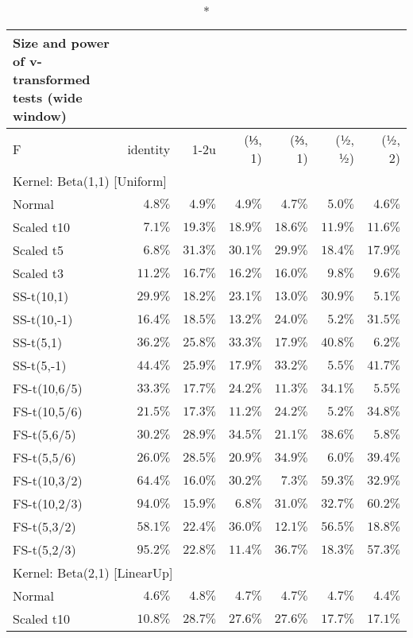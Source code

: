 \setlength{\LTpost}{0mm}
\begin{longtable}{lrrrrrr}
\caption*{
{\large Size and power of v-transformed tests (wide window)}
} \\ 
\toprule
F & identity & \textbar{}1-2u\textbar{} & (⅓, 1) & (⅔, 1) & (½, ½) & (½, 2) \\ 
\midrule
\multicolumn{7}{l}{Kernel: Beta(1,1) [Uniform]} \\ 
\midrule
Normal & $4.8\%$ & $4.9\%$ & $4.9\%$ & $4.7\%$ & $5.0\%$ & $4.6\%$ \\ 
Scaled t10 & $7.1\%$ & $19.3\%$ & $18.9\%$ & $18.6\%$ & $11.9\%$ & $11.6\%$ \\ 
Scaled t5 & $6.8\%$ & $31.3\%$ & $30.1\%$ & $29.9\%$ & $18.4\%$ & $17.9\%$ \\ 
Scaled t3 & $11.2\%$ & $16.7\%$ & $16.2\%$ & $16.0\%$ & $9.8\%$ & $9.6\%$ \\ 
SS-t(10,1) & $29.9\%$ & $18.2\%$ & $23.1\%$ & $13.0\%$ & $30.9\%$ & $5.1\%$ \\ 
SS-t(10,-1) & $16.4\%$ & $18.5\%$ & $13.2\%$ & $24.0\%$ & $5.2\%$ & $31.5\%$ \\ 
SS-t(5,1) & $36.2\%$ & $25.8\%$ & $33.3\%$ & $17.9\%$ & $40.8\%$ & $6.2\%$ \\ 
SS-t(5,-1) & $44.4\%$ & $25.9\%$ & $17.9\%$ & $33.2\%$ & $5.5\%$ & $41.7\%$ \\ 
FS-t(10,6/5) & $33.3\%$ & $17.7\%$ & $24.2\%$ & $11.3\%$ & $34.1\%$ & $5.5\%$ \\ 
FS-t(10,5/6) & $21.5\%$ & $17.3\%$ & $11.2\%$ & $24.2\%$ & $5.2\%$ & $34.8\%$ \\ 
FS-t(5,6/5) & $30.2\%$ & $28.9\%$ & $34.5\%$ & $21.1\%$ & $38.6\%$ & $5.8\%$ \\ 
FS-t(5,5/6) & $26.0\%$ & $28.5\%$ & $20.9\%$ & $34.9\%$ & $6.0\%$ & $39.4\%$ \\ 
FS-t(10,3/2) & $64.4\%$ & $16.0\%$ & $30.2\%$ & $7.3\%$ & $59.3\%$ & $32.9\%$ \\ 
FS-t(10,2/3) & $94.0\%$ & $15.9\%$ & $6.8\%$ & $31.0\%$ & $32.7\%$ & $60.2\%$ \\ 
FS-t(5,3/2) & $58.1\%$ & $22.4\%$ & $36.0\%$ & $12.1\%$ & $56.5\%$ & $18.8\%$ \\ 
FS-t(5,2/3) & $95.2\%$ & $22.8\%$ & $11.4\%$ & $36.7\%$ & $18.3\%$ & $57.3\%$ \\ 
\midrule
\multicolumn{7}{l}{Kernel: Beta(2,1) [LinearUp]} \\ 
\midrule
Normal & $4.6\%$ & $4.8\%$ & $4.7\%$ & $4.7\%$ & $4.7\%$ & $4.4\%$ \\ 
Scaled t10 & $10.8\%$ & $28.7\%$ & $27.6\%$ & $27.6\%$ & $17.7\%$ & $17.1\%$ \\ 

\end{longtable}
